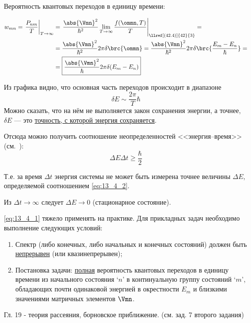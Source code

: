 Вероятность квантовых переходов в единицу времени:

\begin{align}
w_{mn} = \left . \frac{P_{nm}}{T}\right|_{T \to \infty} 
  & = \left. \frac{\abs{\Vmn}^2}{\hbar^2} \lim_{T \to \infty} \frac{f(\ommn, T)}{T} \right|_{\llref[ (42.4)]{42}{3}} = \nonumber \\
  & = \frac{\abs{\Vmn}^2}{\hbar^2} 2 \pi \delta \brc{\ommn}
  = \frac{\abs{\Vmn}^2}{\hbar^2} 2 \pi \delta \brc{\frac{E_m - E_n}{\hbar}} = \nonumber \\
  \label{eq:13_4_1}
  &= \boxed {
    \frac{\abs{\Vmn}^2}{\hbar} 2 \pi \delta (E_m - E_n)
  }
\end{align}

Из графика видно, что основная часть переходов происходит в диапазоне
$$
\delta E \sim \frac{2\pi}{T} \hbar
$$
Можно сказать, что на нём не выполняется закон сохранения энергии, а точнее, $\delta E$ --- это \underline{точность, с которой энергия сохраняется}.

Отсюда можно получить соотношение неопределенностей <<энергия--время>> (см.~):
\begin{equation}
\label{eq:13_4_2}
\boxed{\Delta E \Delta t \ge \frac{\hbar}{2}} 
\end{equation}

Т.е. за время $\Delta t$ энергия системы не может быть измерена точнее величины $\Delta E$, определяемой соотношением \eqref{eq:13_4_2}.

Из $\Delta t \to \infty$ следует $\Delta E \to 0$ (стационарное состояние).

\eqref{eq:13_4_1} тяжело применять на практике. Для прикладных задач необходимо выполнение следующих условий:
\begin{enumerate}
\item Спектр (либо конечных, либо начальных и конечных состояний) должен быть \underline{непрерывен} (или квазинепрерывен);
\item Постановка задачи: \underline{полная} вероятность квантовых переходов в единицу времени из начального состояния `$n$' в континуальную группу состояний `$m$', обладающих почти одинаковой энергией в окрестности $E_m$ и близкими значениями матричных элементов $\Vmn$.
\end{enumerate}

\begin{exmpl}
Гл. 19 - теория рассеяния, борновское приближение. (см. зад. 7 второго задания)
\end{exmpl}

